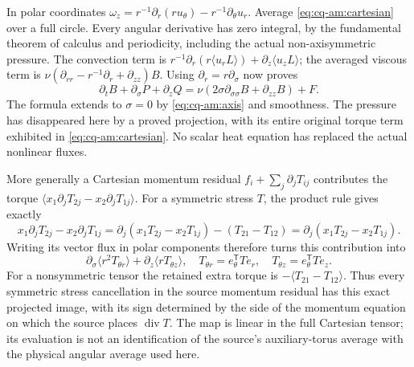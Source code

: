 In polar coordinates
$\omega_z=r^{-1}\partial_r(ru_\theta)
                  -r^{-1}\partial_\theta u_r$.
Average \eqref{eq:cq-am:cartesian} over a full circle. Every angular
derivative has zero integral, by the fundamental theorem of calculus
and periodicity, including the actual non-axisymmetric pressure.
The convection term is
$r^{-1}\partial_r(r\langle u_rL\rangle)
 +\partial_z\langle u_zL\rangle$; the averaged viscous term is
$\nu(\partial_{rr}-r^{-1}\partial_r+\partial_{zz})B$.
Using $\partial_r=r\partial_\sigma$ now proves
\begin{equation}
 \partial_tB+\partial_\sigma P+\partial_zQ
   =\nu(2\sigma\partial_{\sigma\sigma}B+\partial_{zz}B)+F.
 \label{eq:cq-am:pde}
\end{equation}
The formula extends to $\sigma=0$ by \eqref{eq:cq-am:axis} and smoothness.
The pressure has disappeared here by a proved projection, with its
entire original torque term exhibited in \eqref{eq:cq-am:cartesian}.
No scalar heat equation has replaced the actual nonlinear fluxes.

More generally a Cartesian momentum residual
$f_i+\sum_j\partial_jT_{ij}$ contributes the torque
$\langle x_1\partial_jT_{2j}-x_2\partial_jT_{1j}\rangle$.
For a symmetric stress $T$, the product rule gives exactly
\[
 x_1\partial_jT_{2j}-x_2\partial_jT_{1j}
  =\partial_j(x_1T_{2j}-x_2T_{1j})-(T_{21}-T_{12})
  =\partial_j(x_1T_{2j}-x_2T_{1j}).
\]
Writing its vector flux in polar components therefore turns this
contribution into
\begin{equation}
 \partial_\sigma\langle r^2 T_{\theta r}\rangle
       +\partial_z\langle r T_{\theta z}\rangle,
 \quad T_{\theta r}=e_\theta^{\mathsf T}Te_r,
 \quad T_{\theta z}=e_\theta^{\mathsf T}Te_z.
 \label{eq:cq-am:stressmap}
\end{equation}
For a nonsymmetric tensor the retained extra torque is
$-\langle T_{21}-T_{12}\rangle$. Thus every symmetric stress
cancellation in the source momentum residual has this exact projected
image, with its sign determined by the side of the momentum equation
on which the source places $\operatorname{div}T$.
The map is linear in the full Cartesian tensor; its evaluation is not
an identification of the source's auxiliary-torus average with the
physical angular average used here.

